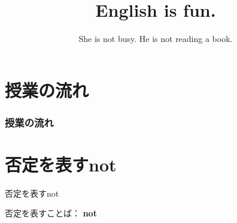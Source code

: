 \documentclass[aspectratio=169,xcolor={dvipsnames,table}]{beamer}
\title{English is fun.}
\subtitle{She is not busy. He is not reading a book.}
\author{}
\institute[]{}
\date[]
\begin{document}
\begin{frame}[plain]
  \titlepage
\end{frame}


\section*{授業の流れ}
\begin{frame}[plain]
  \frametitle{授業の流れ}
  \tableofcontents
\end{frame}

\section{否定を表すnot}
\begin{frame}[plain]{否定を表すnot}
 \Large

否定を表すことば： {\LARGE\bfseries not}\hspace{20pt}
\end{frame}



\end{document}
